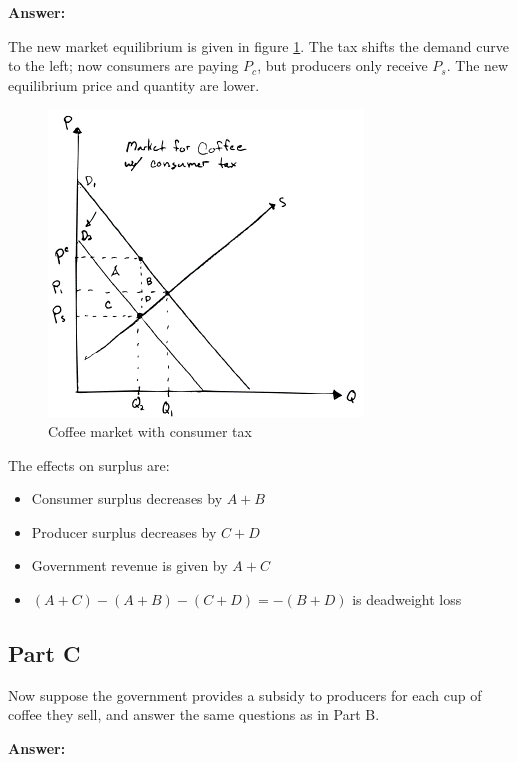 \documentclass[12pt]{article}
\begin{document}
\vspace{2mm}

\textbf{Answer:}

\vspace{2mm}

The new market equilibrium is given in figure \ref{fig:coffee4}. The tax shifts the demand curve to the left; now consumers are paying $P_c$, but producers only receive $P_s$. The new equilibrium price and quantity are lower.

\begin{figure}
    \centering
    \includegraphics[width=.5\textwidth]{../../figs/coffee4.png}
    \caption{Coffee market with consumer tax}
    \label{fig:coffee4}
\end{figure}

The effects on surplus are:
    \begin{itemize}
        \item Consumer surplus decreases by $A + B$
        \item Producer surplus decreases by $C + D$
        \item Government revenue is given by $A + C$
        \item $(A+C) - (A+B) - (C+D) = -(B + D)$ is deadweight loss
    \end{itemize}

\vspace{2mm}

\subsection*{Part C}
Now suppose the government provides a subsidy to producers for each cup of coffee they sell, and answer the same questions as in Part B.

\vspace{2mm}

\textbf{Answer:}
\end{document}
